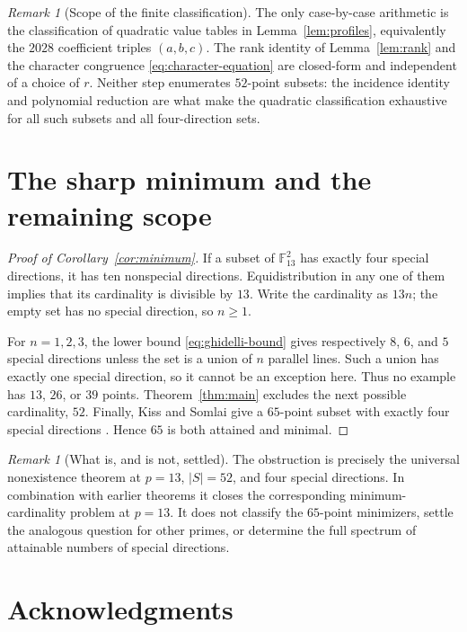 \documentclass[11pt]{amsart}
\theoremstyle{remark}
\newtheorem{remark}[theorem]{Remark}
\newcommand{\F}{\mathbb F}
\begin{document}
\begin{remark}[Scope of the finite classification]
The only case-by-case arithmetic is the classification of quadratic value
tables in Lemma~\ref{lem:profiles}, equivalently the $2028$ coefficient
triples $(a,b,c)$.  The rank identity of Lemma~\ref{lem:rank} and the
character congruence \eqref{eq:character-equation} are closed-form and
independent of a choice of $r$.  Neither step enumerates $52$-point subsets:
the incidence identity and polynomial reduction are what make the quadratic
classification exhaustive for all such subsets and all four-direction sets.
\end{remark}

\section{The sharp minimum and the remaining scope}\label{sec:consequences}

\begin{proof}[Proof of Corollary~\ref{cor:minimum}]
If a subset of $\F_{13}^{2}$ has exactly four special directions, it has ten
nonspecial directions.  Equidistribution in any one of them implies that its
cardinality is divisible by $13$.  Write the cardinality as $13n$; the empty
set has no special direction, so $n\ge1$.

For $n=1,2,3$, the lower bound \eqref{eq:ghidelli-bound} gives respectively
$8$, $6$, and $5$ special directions unless the set is a union of $n$
parallel lines.  Such a union has exactly one special direction, so it cannot
be an exception here.  Thus no example has $13$, $26$, or $39$ points.
Theorem~\ref{thm:main} excludes the next possible cardinality, $52$.
Finally, Kiss and Somlai give a $65$-point subset with exactly four special
directions \cite[Figure~6]{KissSomlaiSpecialDirections}.  Hence $65$ is both
attained and minimal.
\end{proof}

\begin{remark}[What is, and is not, settled]
The obstruction is precisely the universal nonexistence theorem at
$p=13$, $|S|=52$, and four special directions.  In combination with earlier
theorems it closes the corresponding minimum-cardinality problem at $p=13$.
It does not classify the $65$-point minimizers, settle the analogous question
for other primes, or determine the full spectrum of attainable numbers of
special directions.
\end{remark}

\section*{Acknowledgments}
\end{document}

